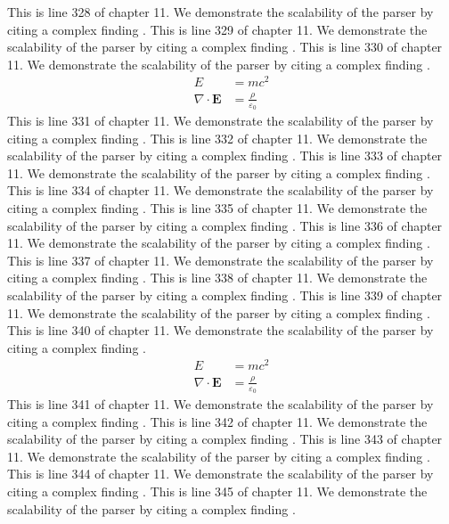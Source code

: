 This is line 328 of chapter 11. We demonstrate the scalability of the parser by citing a complex finding \cite{ref11_328}.
This is line 329 of chapter 11. We demonstrate the scalability of the parser by citing a complex finding \cite{ref11_329}.
This is line 330 of chapter 11. We demonstrate the scalability of the parser by citing a complex finding \cite{ref11_330}.
\begin{align*}
  E &= mc^2 \\
  \nabla \cdot \mathbf{E} &= \frac{\rho}{\varepsilon_0}
\end{align*}
This is line 331 of chapter 11. We demonstrate the scalability of the parser by citing a complex finding \cite{ref11_331}.
This is line 332 of chapter 11. We demonstrate the scalability of the parser by citing a complex finding \cite{ref11_332}.
This is line 333 of chapter 11. We demonstrate the scalability of the parser by citing a complex finding \cite{ref11_333}.
This is line 334 of chapter 11. We demonstrate the scalability of the parser by citing a complex finding \cite{ref11_334}.
This is line 335 of chapter 11. We demonstrate the scalability of the parser by citing a complex finding \cite{ref11_335}.
This is line 336 of chapter 11. We demonstrate the scalability of the parser by citing a complex finding \cite{ref11_336}.
This is line 337 of chapter 11. We demonstrate the scalability of the parser by citing a complex finding \cite{ref11_337}.
This is line 338 of chapter 11. We demonstrate the scalability of the parser by citing a complex finding \cite{ref11_338}.
This is line 339 of chapter 11. We demonstrate the scalability of the parser by citing a complex finding \cite{ref11_339}.
This is line 340 of chapter 11. We demonstrate the scalability of the parser by citing a complex finding \cite{ref11_340}.
\begin{align*}
  E &= mc^2 \\
  \nabla \cdot \mathbf{E} &= \frac{\rho}{\varepsilon_0}
\end{align*}
This is line 341 of chapter 11. We demonstrate the scalability of the parser by citing a complex finding \cite{ref11_341}.
This is line 342 of chapter 11. We demonstrate the scalability of the parser by citing a complex finding \cite{ref11_342}.
This is line 343 of chapter 11. We demonstrate the scalability of the parser by citing a complex finding \cite{ref11_343}.
This is line 344 of chapter 11. We demonstrate the scalability of the parser by citing a complex finding \cite{ref11_344}.
This is line 345 of chapter 11. We demonstrate the scalability of the parser by citing a complex finding \cite{ref11_345}.
